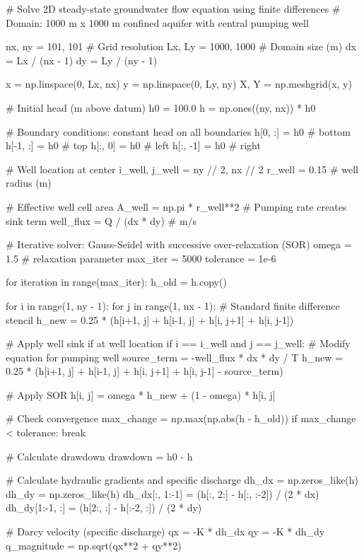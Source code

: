 \documentclass[a4paper, 11pt]{article}
\begin{document}
\begin{pycode}
# Solve 2D steady-state groundwater flow equation using finite differences
# Domain: 1000 m x 1000 m confined aquifer with central pumping well

nx, ny = 101, 101  # Grid resolution
Lx, Ly = 1000, 1000  # Domain size (m)
dx = Lx / (nx - 1)
dy = Ly / (ny - 1)

x = np.linspace(0, Lx, nx)
y = np.linspace(0, Ly, ny)
X, Y = np.meshgrid(x, y)

# Initial head (m above datum)
h0 = 100.0
h = np.ones((ny, nx)) * h0

# Boundary conditions: constant head on all boundaries
h[0, :] = h0      # bottom
h[-1, :] = h0     # top
h[:, 0] = h0      # left
h[:, -1] = h0     # right

# Well location at center
i_well, j_well = ny // 2, nx // 2
r_well = 0.15  # well radius (m)

# Effective well cell area
A_well = np.pi * r_well**2
# Pumping rate creates sink term
well_flux = Q / (dx * dy)  # m/s

# Iterative solver: Gauss-Seidel with successive over-relaxation (SOR)
omega = 1.5  # relaxation parameter
max_iter = 5000
tolerance = 1e-6

for iteration in range(max_iter):
    h_old = h.copy()

    for i in range(1, ny - 1):
        for j in range(1, nx - 1):
            # Standard finite difference stencil
            h_new = 0.25 * (h[i+1, j] + h[i-1, j] + h[i, j+1] + h[i, j-1])

            # Apply well sink if at well location
            if i == i_well and j == j_well:
                # Modify equation for pumping well
                source_term = -well_flux * dx * dy / T
                h_new = 0.25 * (h[i+1, j] + h[i-1, j] + h[i, j+1] + h[i, j-1] - source_term)

            # Apply SOR
            h[i, j] = omega * h_new + (1 - omega) * h[i, j]

    # Check convergence
    max_change = np.max(np.abs(h - h_old))
    if max_change < tolerance:
        break

# Calculate drawdown
drawdown = h0 - h

# Calculate hydraulic gradients and specific discharge
dh_dx = np.zeros_like(h)
dh_dy = np.zeros_like(h)
dh_dx[:, 1:-1] = (h[:, 2:] - h[:, :-2]) / (2 * dx)
dh_dy[1:-1, :] = (h[2:, :] - h[:-2, :]) / (2 * dy)

# Darcy velocity (specific discharge)
qx = -K * dh_dx
qy = -K * dh_dy
q_magnitude = np.sqrt(qx**2 + qy**2)


\end{pycode}
\end{document}
